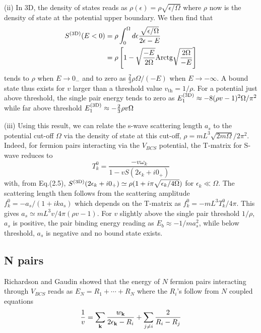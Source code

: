 \documentclass[5p,twocolumn]{elsarticle}
\begin{document}
(ii) In 3D, the density of states reads as  
$\rho(\epsilon)=\rho\sqrt{\epsilon/\Omega}$
where $\rho$ now is the density of state at the potential upper boundary. We then find that
\begin{equation}
\begin{split}
S^{{\text{(3D)}}}(E<0)&=\rho\int_0^{\Omega}{}d\epsilon\frac{\sqrt{\epsilon/\Omega}}{2\epsilon-E}\\
	&=\rho\left[1-\sqrt{\frac{-E}{2\Omega}}\text{Arctg}\sqrt{\frac{2\Omega}{-E}}\right]
\end{split}
\end{equation}
tends to $\rho$ when $E\rightarrow0_-$ and to zero as $\frac{2}{3}\rho\Omega/(-E)$ when $E\rightarrow-\infty$. 
A bound state thus exists for $v$ larger than a threshold value $v_{\text{th}}=1/\rho$.  For a potential just above threshold, the single pair energy tends to zero as 
$
E_1^{{\text{(3D)}}}\approx-8(\rho v-1)^2\Omega/\pi^2
$
while far above threshold
$E_1^{{\text{(3D)}}}\approx-\frac{2}{3}\rho{v}\Omega$

(iii) Using this result, we can relate the s-wave scattering length $a_{s}$ to the potential cut-off $\Omega$ via the density of state  at this cut-off, $\rho=mL^3\sqrt{2m\Omega}/2\pi^2$. Indeed, for fermion pairs interacting via the $V_{BCS}$ potential, the T-matrix for S-wave  reduces to
\begin{equation}
T^{0}_{k}=\frac{-v\omega_k}{1-vS(2\epsilon_k+i0_+)}
\end{equation}
with, from Eq.(2.5), $S^{{\text{(3D)}}}(2\epsilon_k+i0_+)\simeq\rho(1+i\pi\sqrt{\epsilon_k/4\Omega})$  for $\epsilon_k\ll\Omega$. The scattering length then follows from the scattering amplitude $f^0_k= -a_s/(1+ika_s)$ which depends on the T-matrix as $f^0_k= -mL^3T^{0}_{k}/4\pi$. This gives $a_s\simeq mL^3v/4\pi(\rho v-1)$. For $v$ slightly above the single pair threshold $1/\rho $, $a_s$ is positive, the pair binding energy reading as $E_{b}\approx-1/ma_s^{2}$, while below threshold, $a_s$ is negative and no bound state exists. 

\subsection{N pairs\label{sec:NPair}}
Richardson \cite{Richardson1} and Gaudin \cite{gaudin} showed that the energy of $N$ fermion pairs interacting through $V_ {BCS}$ reads as $E_N=R_1+\cdots+R_N$ where the $R_i$'s follow from $N$ coupled equations
\begin{equation}
\frac{1}{v}=\sum_{\mathbf{k}}\frac{w_{\mathbf{k}}}{2\epsilon_{\mathbf{k}}-R_i}+\sum_{j\neq{}i}\frac{2}{R_i-R_j}
\end{equation}
\end{document}
